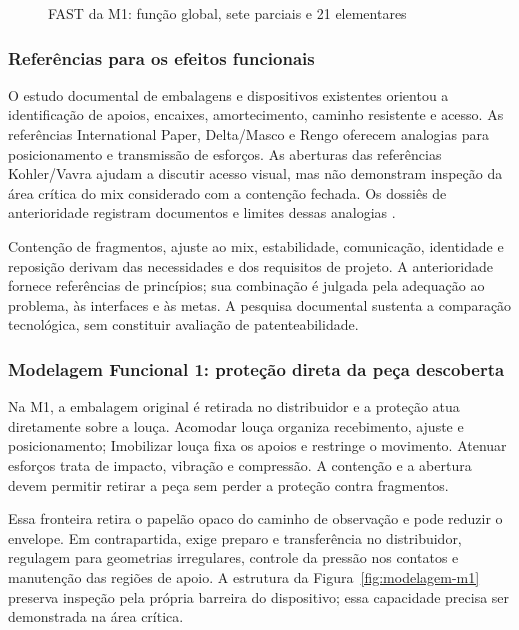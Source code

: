\begin{landscape}
\begin{figure}[H]
\centering
\caption{FAST da M1: função global, sete parciais e 21 elementares}
\label{fig:fast}
\end{figure}
\end{landscape}

\subsubsection{Referências para os efeitos funcionais}

O estudo documental de embalagens e dispositivos existentes orientou a identificação de apoios, encaixes, amortecimento, caminho resistente e acesso. As referências International Paper, Delta/Masco e Rengo oferecem analogias para posicionamento e transmissão de esforços. As aberturas das referências Kohler/Vavra ajudam a discutir acesso visual, mas não demonstram inspeção da área crítica do mix considerado com a contenção fechada. Os dossiês de anterioridade registram documentos e limites dessas analogias \citep{equipeanterioridade2026}.

Contenção de fragmentos, ajuste ao mix, estabilidade, comunicação, identidade e reposição derivam das necessidades e dos requisitos de projeto. A anterioridade fornece referências de princípios; sua combinação é julgada pela adequação ao problema, às interfaces e às metas. A pesquisa documental sustenta a comparação tecnológica, sem constituir avaliação de patenteabilidade.

\subsubsection{Modelagem Funcional 1: proteção direta da peça descoberta}

Na M1, a embalagem original é retirada no distribuidor e a proteção atua diretamente sobre a louça. Acomodar louça organiza recebimento, ajuste e posicionamento; Imobilizar louça fixa os apoios e restringe o movimento. Atenuar esforços trata de impacto, vibração e compressão. A contenção e a abertura devem permitir retirar a peça sem perder a proteção contra fragmentos.

Essa fronteira retira o papelão opaco do caminho de observação e pode reduzir o envelope. Em contrapartida, exige preparo e transferência no distribuidor, regulagem para geometrias irregulares, controle da pressão nos contatos e manutenção das regiões de apoio. A estrutura da Figura~\ref{fig:modelagem-m1} preserva inspeção pela própria barreira do dispositivo; essa capacidade precisa ser demonstrada na área crítica.

